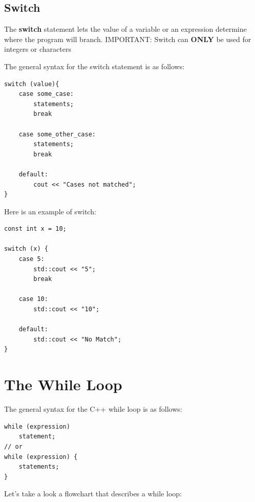 \documentclass{report}
\begin{document}
    \subsection{Switch}
    \bigbreak \noindent 
    \begin{concept}
 The \textbf{switch} statement lets the value of a variable or an expression determine where the program will branch. IMPORTANT: Switch can \textbf{ONLY} be used for integers or characters
	\end{concept}
    \bigbreak \noindent 
    The general syntax for the switch statement is as follows:
    \bigbreak \noindent 
    \sepline
    \begin{verbatim}
switch (value){
    case some_case:
        statements;
        break

    case some_other_case:
        statements;
        break

    default:
        cout << "Cases not matched";
}
    \end{verbatim}
    \sepline
    \bigbreak \noindent 
    \bigbreak \noindent 
    Here is an example of switch:
    \bigbreak \noindent 
    \sepline
    \begin{verbatim}
const int x = 10;

switch (x) {
    case 5:
        std::cout << "5";
        break

    case 10:
        std::cout << "10";

    default:
        std::cout << "No Match";
}
    \end{verbatim}
    \sepline
    \bigbreak \noindent 

    \pagebreak \bigbreak \noindent 
    \section{\LARGE The While Loop}
    \bigbreak \noindent 
    The general syntax for the C++ while loop is as follows:
    \bigbreak \noindent 
    \sepline
    \begin{verbatim}
while (expression)
    statement;
// or
while (expression) {
    statements;
}
    \end{verbatim}
    \sepline
    \bigbreak \noindent 
    \begin{minipage}[]{0.47\textwidth}
        Let's take a look a flowchart that describes a while loop:
    \end{minipage}
    \begin{minipage}[]{0.47\textwidth}
    \end{minipage}
    \bigbreak \noindent 
\end{document}
